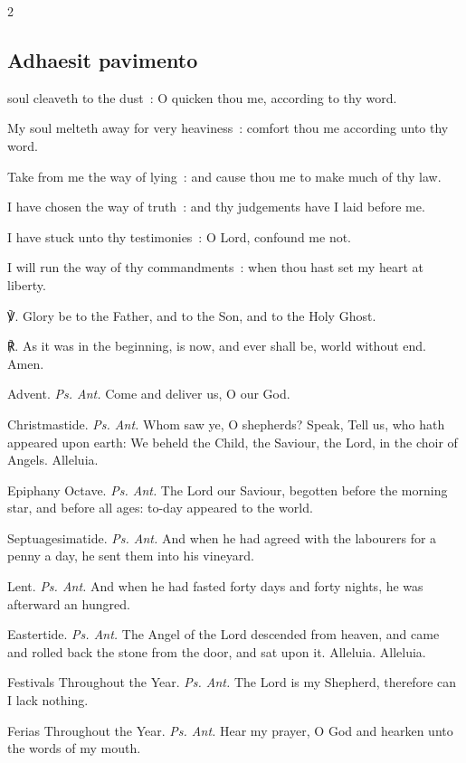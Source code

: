 \begin{multicols}{2}
\subsection{Adhaesit pavimento}
 soul cleaveth to the dust~: O quicken thou me, according to thy word.\par
{}
My soul melteth away for very heaviness~: comfort thou me according unto thy word.\par
{}Take from me the way of lying~: and cause thou me to make much of thy law.\par
{}I have chosen the way of truth~: and thy judgements have I laid before me.\par
{}I have stuck unto thy testimonies~: O Lord, confound me not.\par
{}I will run the way of thy commandments~: when thou hast set my heart at liberty.\par
℣. Glory be to the Father, and to the Son, and to the Holy Ghost.\par
℟. As it was in the beginning, is now, and ever shall be, world without end. Amen.\\
\par\noindent
{\color{RubricRed}Advent.} \textit{Ps. Ant.} Come and deliver us, O our God.
\par\noindent
{\color{RubricRed}Christmastide.} \textit{Ps. Ant.} Whom saw ye, O shepherds? Speak, Tell us, who hath appeared upon earth: We beheld the Child, the Saviour, the Lord, in the choir of Angels. Alleluia.
\par\noindent
{\color{RubricRed}Epiphany Octave.} \textit{Ps. Ant.} The Lord our Saviour, begotten before the morning star, and before all ages: to-day appeared to the world.
\par\noindent
{\color{RubricRed}Septuagesimatide.} \textit{Ps. Ant.} And when he had agreed with the labourers for a penny a day, he sent them into his vineyard.
\par\noindent
{\color{RubricRed}Lent.} \textit{Ps. Ant.} And when he had fasted forty days and forty nights, he was afterward an hungred.
\par\noindent
{\color{RubricRed}Eastertide.} \textit{Ps. Ant.} The Angel of the Lord descended from heaven, and came and rolled back the stone from the door, and sat upon it. Alleluia. Alleluia.
\par\noindent
{\color{RubricRed}Festivals Throughout the Year.} \textit{Ps. Ant.} The Lord is my Shepherd, therefore can I lack nothing.
\par\noindent
{\color{RubricRed}Ferias Throughout the Year.} \textit{Ps. Ant.} Hear my prayer, O God and hearken unto the words of my mouth.


\end{multicols}
